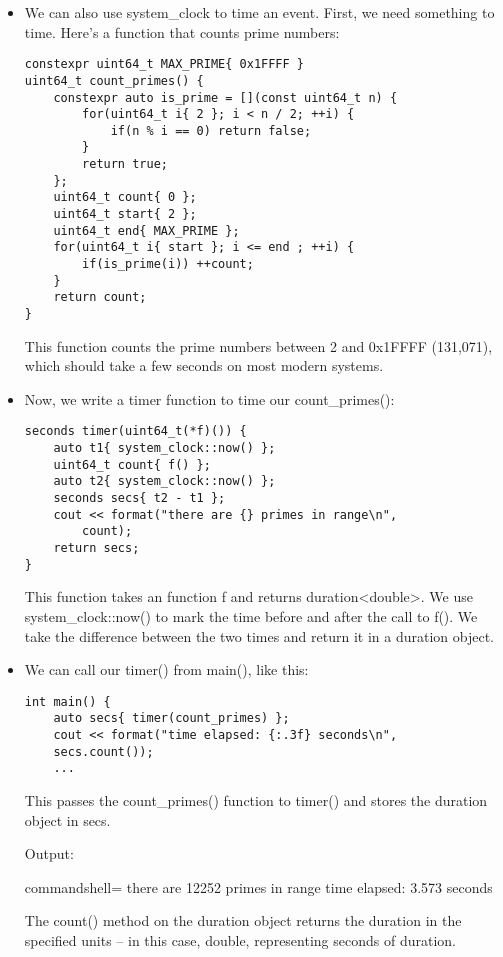 \begin{itemize}
\item 
We can also use system\_clock to time an event. First, we need something to time. Here's a function that counts prime numbers:

\begin{lstlisting}[style=styleCXX]
constexpr uint64_t MAX_PRIME{ 0x1FFFF }
uint64_t count_primes() {
	constexpr auto is_prime = [](const uint64_t n) {
		for(uint64_t i{ 2 }; i < n / 2; ++i) {
			if(n % i == 0) return false;
		}
		return true;
	};
	uint64_t count{ 0 };
	uint64_t start{ 2 };
	uint64_t end{ MAX_PRIME };
	for(uint64_t i{ start }; i <= end ; ++i) {
		if(is_prime(i)) ++count;
	}
	return count;
}
\end{lstlisting}

This function counts the prime numbers between 2 and 0x1FFFF (131,071), which should take a few seconds on most modern systems.

\item 
Now, we write a timer function to time our count\_primes():

\begin{lstlisting}[style=styleCXX]
seconds timer(uint64_t(*f)()) {
	auto t1{ system_clock::now() };
	uint64_t count{ f() };
	auto t2{ system_clock::now() };
	seconds secs{ t2 - t1 };
	cout << format("there are {} primes in range\n",
		count);
	return secs;
}
\end{lstlisting}

This function takes an function f and returns duration<double>. We use system\_clock::now() to mark the time before and after the call to f(). We take the difference between the two times and return it in a duration object.

\item 
We can call our timer() from main(), like this:

\begin{lstlisting}[style=styleCXX]
int main() {
	auto secs{ timer(count_primes) };
	cout << format("time elapsed: {:.3f} seconds\n",
	secs.count());
	...
\end{lstlisting}

This passes the count\_primes() function to timer() and stores the duration object in secs.

Output:

\begin{tcblisting}{commandshell={}}
there are 12252 primes in range
time elapsed: 3.573 seconds
\end{tcblisting}

The count() method on the duration object returns the duration in the specified units – in this case, double, representing seconds of duration.


\end{itemize}
